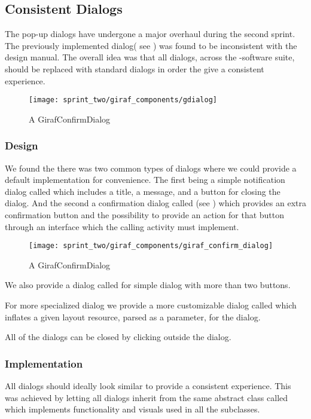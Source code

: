 \subsection{Consistent Dialogs}
\label{sec:consistent_dialogs}

The pop-up dialogs have undergone a major overhaul during the second sprint. The previously implemented dialog( see ) was found to be inconsistent with the \giraf design manual. The overall idea was that all dialogs, across the \giraf-software suite, should be replaced with standard dialogs in order the give a consistent experience. 

\begin{figure}[!htbp]
    \centering
    \texttt{[image: sprint\_two/giraf\_components/gdialog]}
    \caption{A GirafConfirmDialog}
    \label{fig:gdialog}
\end{figure}

\subsubsection{Design}

We found the there was two common types of dialogs where we could provide a default implementation for convenience. The first being a simple notification dialog called  which includes a title, a message, and a button for closing the dialog. And the second a confirmation dialog called  (see ) which provides an extra confirmation button and the possibility to provide an action for that button through an interface which the calling activity must implement. 

\begin{figure}[!htbp]
    \centering
    \texttt{[image: sprint\_two/giraf\_components/giraf\_confirm\_dialog]}
    \caption{A GirafConfirmDialog}
    \label{fig:giraf_confirm_dialog}
\end{figure}

We also provide a dialog called  for simple dialog with more than two buttons.

For more specialized dialog we provide a more customizable dialog called  which inflates a given layout resource, parsed as a parameter, for the dialog.

All of the dialogs can be closed by clicking outside the dialog.

\subsubsection{Implementation}

All dialogs should ideally look similar to provide a consistent experience. This was achieved by letting all dialogs inherit from the same abstract class called  which implements functionality and visuals used in all the subclasses.

